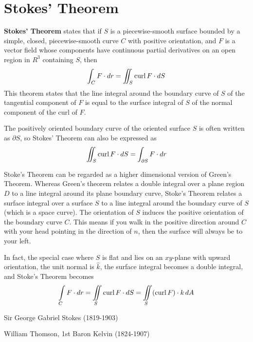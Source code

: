 \section{Stokes' Theorem}

\textbf{Stokes' Theorem} states that if $S$ is a piecewise-smooth surface bounded by a simple, closed, piecewise-smooth curve $C$ with positive orientation, and $F$ is a vector field whose components have continuous partial derivatives on an open region in $R^3$ containing $S$, then $$ \int_C F \cdot dr = \iint_S \operatorname{curl}{F} \cdot dS$$ This theorem states that the line integral around the boundary curve of $S$ of the tangential component of $F$ is equal to the surface integral of $S$ of the normal component of the curl of $F$.

The positively oriented boundary curve of the oriented surface $S$ is often written as $\partial S$, so Stokes' Theorem can also be expressed as $$\iint_S \operatorname{curl}{F} \cdot dS = \int_{\partial S} F \cdot dr$$

Stoke's Theorem can be regarded as a higher dimensional version of Green's Theorem. Whereas Green's theorem relates a double integral over a plane region $D$ to a line integral around its plane boundary curve, Stoke's Theorem relates a surface integral over a surface $S$ to a line integral around the boundary curve of $S$ (which is a space curve). The orientation of $S$ induces the positive orientation of the boundary curve $C$. This means if you walk in the positive direction around $C$ with your head pointing in the direction of $n$, then the surface will always be to your left.

In fact, the special case where $S$ is flat and lies on an $xy$-plane with upward orientation, the unit normal is $\hat{k}$, the surface integral becomes a double integral, and Stoke's Theorem becomes $$\int\limits_C F \cdot dr = \iint\limits_S \operatorname{curl}{F} \cdot dS = \iint\limits_S (\operatorname{curl}{F}) \cdot k \, dA$$


Sir George Gabriel Stokes (1819-1903)

William Thomson, 1st Baron Kelvin (1824-1907)


